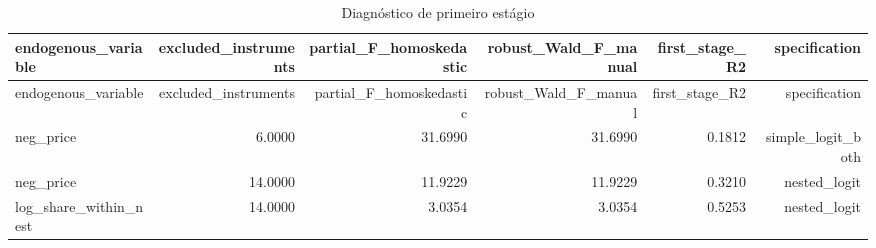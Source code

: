 \begingroup
\scriptsize
\begin{longtable}{@{}lrrrrr@{}}
\caption{Diagnóstico de primeiro estágio}\label{tab:first-stage}\\
\toprule
endogenous\_variable & excluded\_instruments & partial\_F\_homoskedastic & robust\_Wald\_F\_manual & first\_stage\_R2 & specification \\
\midrule
\endfirsthead
\toprule
endogenous\_variable & excluded\_instruments & partial\_F\_homoskedastic & robust\_Wald\_F\_manual & first\_stage\_R2 & specification \\
\midrule
\endhead
neg\_price & 6.0000 & 31.6990 & 31.6990 & 0.1812 & simple\_logit\_both \\
neg\_price & 14.0000 & 11.9229 & 11.9229 & 0.3210 & nested\_logit \\
log\_share\_within\_nest & 14.0000 & 3.0354 & 3.0354 & 0.5253 & nested\_logit \\
\bottomrule
\end{longtable}
\endgroup
